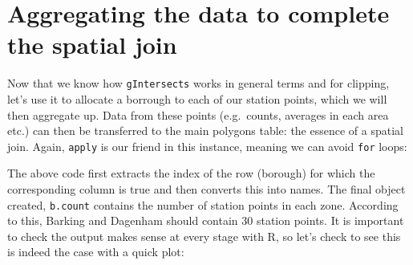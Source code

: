 \documentclass[]{article}
\newenvironment{Shaded}{}{}
\newcommand{\KeywordTok}[1]{\textcolor[rgb]{0.00,0.44,0.13}{\textbf{{#1}}}}
\newcommand{\DataTypeTok}[1]{\textcolor[rgb]{0.56,0.13,0.00}{{#1}}}
\newcommand{\DecValTok}[1]{\textcolor[rgb]{0.25,0.63,0.44}{{#1}}}
\newcommand{\CommentTok}[1]{\textcolor[rgb]{0.38,0.63,0.69}{\textit{{#1}}}}
\newcommand{\NormalTok}[1]{{#1}}
\begin{document}
\section{Aggregating the data to complete the spatial join}

Now that we know how \texttt{gIntersects} works in general terms and for
clipping, let's use it to allocate a borrough to each of our station
points, which we will then aggregate up. Data from these points
(e.g.~counts, averages in each area etc.) can then be transferred to the
main polygons table: the essence of a spatial join. Again,
\texttt{apply} is our friend in this instance, meaning we can avoid
\texttt{for} loops:

\begin{Shaded}
\end{Shaded}
The above code first extracts the index of the row (borough) for which
the corresponding column is true and then converts this into names. The
final object created, \texttt{b.count} contains the number of station
points in each zone. According to this, Barking and Dagenham should
contain 30 station points. It is important to check the output makes
sense at every stage with R, so let's check to see this is indeed the
case with a quick plot:
\end{document}
